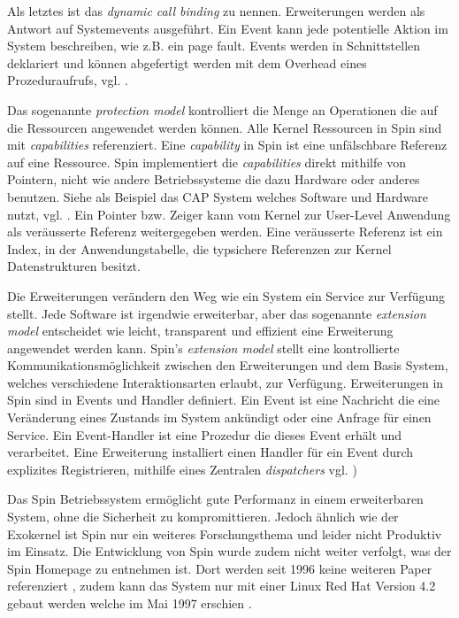 \documentclass[11pt,technote]{IEEEtran}
\begin{document}
      Als letztes ist das \textit{dynamic call binding} zu nennen. Erweiterungen werden als Antwort auf Systemevents ausgef\"uhrt.
      Ein Event kann jede potentielle Aktion im System beschreiben, wie z.B. ein page fault. Events werden in Schnittstellen deklariert
      und k\"onnen abgefertigt werden mit dem Overhead eines Prozeduraufrufs, vgl. \cite[S. 267 f]{inproc:spin}.
      
      Das sogenannte \textit{protection model} kontrolliert die Menge an Operationen die auf die Ressourcen angewendet werden k\"onnen.
      Alle Kernel Ressourcen in Spin sind mit \textit{capabilities} referenziert. 
      Eine \textit{capability} in Spin ist eine unf\"alschbare Referenz auf eine Ressource.
      Spin implementiert die \textit{capabilities} direkt mithilfe von Pointern, nicht wie andere Betriebssysteme die dazu Hardware oder anderes benutzen.
      Siehe als Beispiel das CAP System welches Software und Hardware nutzt, vgl. \cite{inproc:cap}.
      Ein Pointer bzw. Zeiger kann vom Kernel zur User-Level Anwendung als ver\"ausserte Referenz weitergegeben werden.
      Eine ver\"ausserte Referenz ist ein Index, in der Anwendungstabelle, die typsichere Referenzen zur Kernel Datenstrukturen besitzt.
      
      Die Erweiterungen ver\"andern den Weg wie ein System ein Service zur Verf\"ugung stellt. Jede Software ist irgendwie erweiterbar, 
      aber das sogenannte \textit{extension model} entscheidet wie leicht, transparent und effizient eine Erweiterung angewendet werden kann. 
      Spin's \textit{extension model} stellt eine kontrollierte Kommunikationsm\"oglichkeit zwischen den Erweiterungen und dem Basis System,
      welches verschiedene Interaktionsarten erlaubt, zur Verf\"ugung.
      Erweiterungen in Spin sind in Events und Handler definiert. Ein Event ist eine Nachricht die eine Ver\"anderung eines Zustands im System ank\"undigt
      oder eine Anfrage f\"ur einen Service. Ein Event-Handler ist eine Prozedur die dieses Event erh\"alt und verarbeitet. 
      Eine Erweiterung installiert einen Handler f\"ur ein Event durch explizites Registrieren, mithilfe eines Zentralen
      \textit{dispatchers} vgl. \cite[S. 272]{inproc:spin})
      
      Das Spin Betriebssystem erm\"oglicht gute Performanz in einem erweiterbaren System, ohne die Sicherheit zu kompromittieren.
      Jedoch \"ahnlich wie der Exokernel ist Spin nur ein weiteres Forschungsthema und leider nicht Produktiv im Einsatz.
      Die Entwicklung von Spin wurde zudem nicht weiter verfolgt, was der Spin Homepage zu entnehmen ist.
      Dort werden seit 1996 keine weiteren Paper referenziert \cite{Url:spin:papers}, zudem kann das System nur mit einer Linux Red Hat Version 4.2 
      gebaut werden welche im Mai 1997 erschien \cite{Url:spin:distro}.
      
\end{document}
